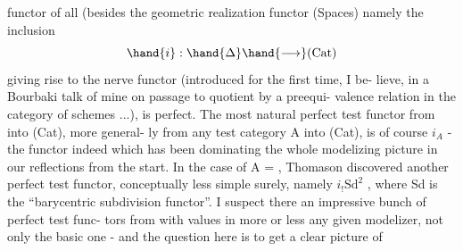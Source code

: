 functor of all (besides the geometric realization functor \hand{$\Delta\to$}(Spaces)\hand{),}
namely the inclusion
\[ \hand{i} : \hand{\Delta} \hand{\longrightarrow} \text{(Cat)} \]
giving rise to the nerve functor (introduced for the first time,  I be-%
lieve,  in a Bourbaki talk of mine\hand{,} on passage to quotient by a preequi-%
valence relation in the category of schemes ...),  is  \hand{\uline{\textcolor{black}{not}}} perfect.
The most natural perfect test functor from \hand{$\Delta$} into (Cat),  more general-%
ly from any  test category A  into (Cat),  is of course  $i_A$  -  the
functor indeed which has been dominating the whole modelizing picture
in our reflections from the start.  In the case of A = \hand{$\Delta$},  Thomason
discovered another  perfect test functor,  conceptually less simple
surely,  namely  $i_{!}\mathrm{Sd}^{2}$ ,  where Sd is the ``barycentric subdivision
functor''.  I suspect there   an impressive bunch of perfect test func-%
tors from \hand{$\Delta$} with values in more or less any given modelizer,  not only
the basic one  -  and the question here is to get a clear picture of

